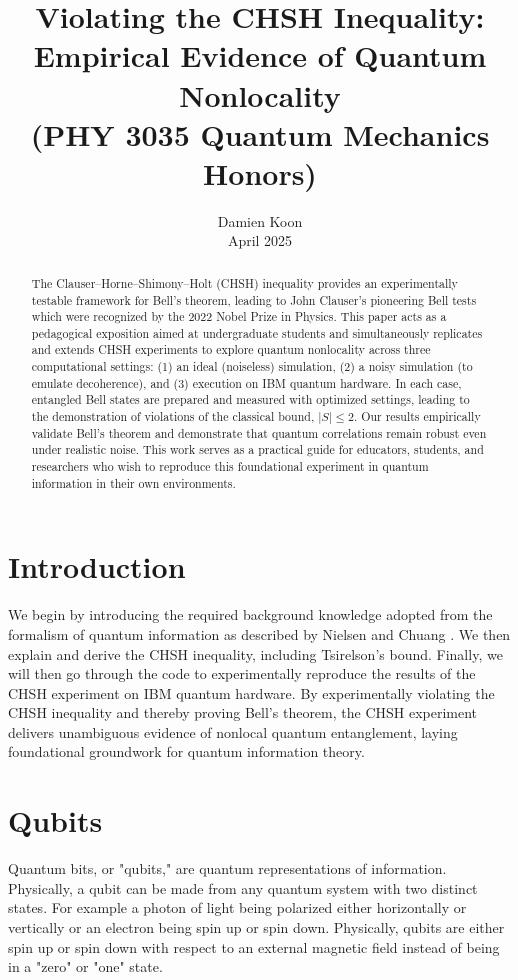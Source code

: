 \documentclass[12pt]{article}
\title{Violating the CHSH Inequality: \\ Empirical Evidence of Quantum Nonlocality \\ (PHY 3035 Quantum Mechanics Honors)}
\author{Damien Koon\\[0.5em]
April 2025} %
\date{} %
\makeatletter
\renewcommand\tableofcontents{%
  \null\hfill\textbf{\Large\contentsname}\hfill\null\par
  \@mkboth{\MakeUppercase\contentsname}{\MakeUppercase\contentsname}%
  \@starttoc{toc}%
}
\makeatother
\begin{document}
\maketitle

\begin{abstract}
The Clauser–Horne–Shimony–Holt (CHSH) inequality provides an experimentally testable framework for Bell’s theorem, leading to John Clauser’s pioneering Bell tests which were recognized by the 2022 Nobel Prize in Physics. This paper acts as a pedagogical exposition aimed at undergraduate students and simultaneously replicates and extends CHSH experiments to explore quantum nonlocality across three computational settings: (1) an ideal (noiseless) simulation, (2) a noisy simulation (to emulate decoherence), and (3) execution on IBM quantum hardware. In each case, entangled Bell states are prepared and measured with optimized settings, leading to the demonstration of violations of the classical bound, $|S| \leq 2$. Our results empirically validate Bell’s theorem and demonstrate that quantum correlations remain robust even under realistic noise. This work serves as a practical guide for educators, students, and researchers who wish to reproduce this foundational experiment in quantum information in their own environments.
\end{abstract}

\newpage
\tableofcontents
\newpage
\section{Introduction}

We begin by introducing the required background knowledge adopted from the  formalism of quantum information as described by Nielsen and Chuang \cite{Quantum_Information}. We then explain and derive the CHSH inequality, including Tsirelson's bound. Finally, we will then go through the code to experimentally reproduce the results of the CHSH experiment on IBM quantum hardware\cite{ibm_quantum}. By experimentally violating the CHSH inequality and thereby proving Bell’s theorem, the CHSH experiment delivers unambiguous evidence of nonlocal quantum entanglement, laying foundational groundwork for quantum information theory.

\section{Qubits}

Quantum bits, or "qubits," are quantum representations of information. Physically, a qubit can be made from any quantum system with two distinct states. For example a photon of light being polarized either horizontally or vertically or an electron being spin up or spin down. Physically, qubits are either spin up or spin down with respect to an external magnetic field instead of being in a "zero" or "one" state. 
\end{document}
